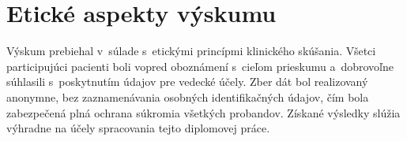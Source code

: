 \section{Etické aspekty výskumu}

Výskum prebiehal v~súlade s~etickými princípmi klinického skúšania. Všetci participujúci pacienti boli vopred oboznámení s~cieľom prieskumu a~dobrovoľne súhlasili s~poskytnutím údajov pre vedecké účely. Zber dát bol realizovaný anonymne, bez zaznamenávania osobných identifikačných údajov, čím bola zabezpečená plná ochrana súkromia všetkých probandov. Získané výsledky slúžia výhradne na účely spracovania tejto diplomovej práce.

\clearpage
